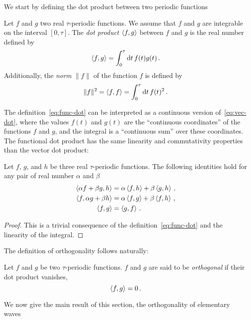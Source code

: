 We start by defining the dot product between two periodic functions
\begin{definition}
  Let $f$ and $g$ two real $\tau$-periodic functions. We assume that $f$ and $g$ are
  integrable on the interval $[0,\tau]$. The \emph{dot product} $\braket{f,g}$ between $f$
  and $g$ is the real number defined by
  \begin{equation}
    \braket{f,g}=\int_{0}^{\tau}\mathrm{d} t\, f(t)g(t)\,.\label{eq:func-dot}
  \end{equation}
  Additionally, the \emph{norm} $\|f\|$ of the function $f$ is defined by
  \begin{equation}
    \|f\|^2=\braket{f,f}=\int_{0}^{\tau}\mathrm{d} t\, f(t)^2\,.
  \end{equation}
\end{definition}
The definition~\cref{eq:func-dot} can be interpreted as a continuous version
of~\cref{eq:vec-dot}, where the values $f(t)$ and $g(t)$ are the ``continuous
coordinates'' of the functions $f$ and $g$, and the integral is a ``continuous sum'' over
these coordinates. The functional dot product has the same linearity and commutativity
properties than the vector dot product:
\begin{proposition}
  Let $f$, $g$, and $h$ be three real $\tau$-periodic functions. The following identities
  hold for any pair of real number $\alpha$ and $\beta$
  \begin{align}
    \braket{\alpha f+\beta g,h}&=\alpha\braket{f,h}+\beta\braket{g,h}\,,\\
    \braket{f,\alpha g+\beta h}&=\alpha\braket{f,g}+\beta\braket{f,h}\,,\\
    \braket{f,g}&=\braket{g,f}\,.
  \end{align}
\end{proposition}
\begin{proof}
  This is a trivial consequence of the definition~\cref{eq:func-dot} and the linearity of
  the integral.
\end{proof}
The definition of orthogonality follows naturally:
\begin{definition}
  \label{def:dot-rfunc}
  Let $f$ and $g$ be two $\tau$-periodic functions. $f$ and $g$ are said to be
  \emph{orthogonal} if their dot product vanishes, \ie
  \begin{equation}
    \braket{f,g}=0\,.
  \end{equation}
\end{definition}
We now give the main result of this section, \ie the orthogonality of elementary waves
